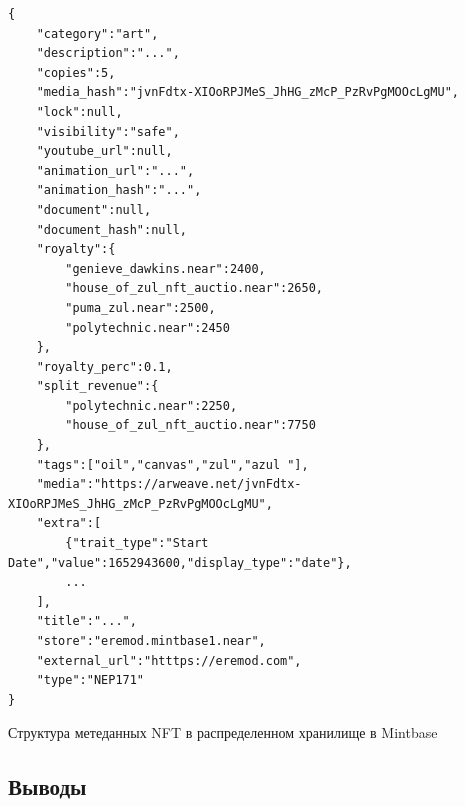 \begin{listing}
\begin{verbatim}
{
    "category":"art",
    "description":"...",
    "copies":5,
    "media_hash":"jvnFdtx-XIOoRPJMeS_JhHG_zMcP_PzRvPgMOOcLgMU",
    "lock":null,
    "visibility":"safe",
    "youtube_url":null,
    "animation_url":"...",
    "animation_hash":"...",
    "document":null,
    "document_hash":null,
    "royalty":{
        "genieve_dawkins.near":2400,
        "house_of_zul_nft_auctio.near":2650,
        "puma_zul.near":2500,
        "polytechnic.near":2450
    },
    "royalty_perc":0.1,
    "split_revenue":{
        "polytechnic.near":2250,
        "house_of_zul_nft_auctio.near":7750
    },
    "tags":["oil","canvas","zul","azul "],
    "media":"https://arweave.net/jvnFdtx-XIOoRPJMeS_JhHG_zMcP_PzRvPgMOOcLgMU",
    "extra":[
        {"trait_type":"Start Date","value":1652943600,"display_type":"date"},
        ...
    ],
    "title":"...",
    "store":"eremod.mintbase1.near",
    "external_url":"htttps://eremod.com",
    "type":"NEP171"
}

\end{verbatim}
\caption{Структура метеданных NFT в распределенном хранилище в Mintbase}
\label{lst.mintbase.nftstructmeta}
\end{listing}

\subsection{Выводы}
